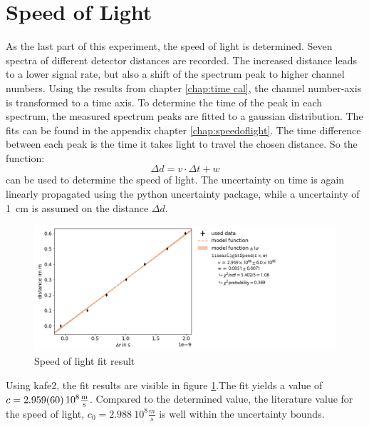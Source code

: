 \section{Speed of Light}
As the last part of this experiment, the speed of light is determined. Seven spectra of different detector distances are recorded. The increased distance leads to a lower signal rate, but also a shift of the spectrum peak to higher channel numbers. Using the results from chapter \ref{chap:time cal}, the channel number-axis is transformed to a time axis. To determine the time of the peak in each spectrum, the measured spectrum peaks are fitted to a gaussian distribution. The fits can be found in the appendix chapter \ref{chap:speedoflight}.
The time difference between each peak is the time it takes light to travel the chosen distance. So the function: 
$$\Delta d = v\cdot \Delta t + w$$
can be used to determine the speed of light. The uncertainty on time is again linearly propagated using the python uncertainty package, while a uncertainty of \SI{1}{cm} is assumed on the distance $\Delta d$. 
\begin{figure}[]
    \centering
    \includegraphics[width=200mm,scale=0.5]{Positronium/include/lightspeedfit.png}
    \caption{Speed of light fit result} 
    \label{fig:lightspeedfit}
\end{figure}
Using kafe2, the fit results are visible in figure \ref{fig:lightspeedfit}.The fit yields a value of $c = \SI{2.959 \pm 0.06}{10^8\frac{m}{s}}$. Compared to the determined value, the literature value for the speed of light, $c_0 = \SI{2.988}{10^8\frac{m}{s}}$ is well within the uncertainty bounds. 

